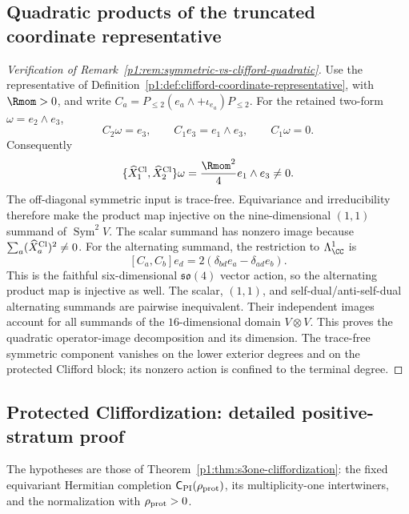 \documentclass[11pt]{article}
\begin{document}
\subsection{Quadratic products of the truncated coordinate representative}
\label{p1:app:truncated-quadratic-content}

\begin{proof}[Verification of Remark~\ref{p1:rem:symmetric-vs-clifford-quadratic}]
Use the representative of
Definition~\ref{p1:def:clifford-coordinate-representative}, with
\(\Rmom>0\), and write
\(C_a=P_{\le2}(e_a\wedge+\iota_{e_a})P_{\le2}\).
For the retained two-form \(\omega=e_2\wedge e_3\),
\[
 C_2\omega=e_3,\qquad C_1e_3=e_1\wedge e_3,\qquad C_1\omega=0.
\]
Consequently
\[
 \{\widehat X_1^{\rm Cl},\widehat X_2^{\rm Cl}\}\omega
 =\frac{\Rmom^2}{4}e_1\wedge e_3\ne0.
\]
The off-diagonal symmetric input is trace-free.  Equivariance and
irreducibility therefore make the product map injective on the
nine-dimensional \((1,1)\) summand of \(\operatorname{Sym}^2V\).
The scalar summand has nonzero image because
\(\sum_a(\widehat X_a^{\rm Cl})^2\ne0\).
For the alternating summand, the restriction to \(\Lambda^1_\CC\) is
\[
 [C_a,C_b]e_d=2(\delta_{bd}e_a-\delta_{ad}e_b).
\]
This is the faithful six-dimensional \(\mathfrak{so}(4)\) vector action,
so the alternating product map is injective as well.  The scalar,
\((1,1)\), and self-dual/anti-self-dual alternating summands are pairwise
inequivalent.  Their independent images account for all summands of the
\(16\)-dimensional domain \(V\otimes V\).  This proves the quadratic
operator-image decomposition and its dimension.  The trace-free symmetric
component vanishes on the lower exterior degrees and on the protected
Clifford block; its nonzero action is confined to the terminal degree.
\end{proof}

\subsection{Protected Cliffordization: detailed positive-stratum proof}
\label{p1:app:protected-cliffordization-proof}
The hypotheses are those of
Theorem~\ref{p1:thm:s3one-cliffordization}: the fixed equivariant Hermitian
completion \(\mathsf C_{\rm PI}(\rho_{\rm prot})\), its multiplicity-one
intertwiners, and the normalization with \(\rho_{\rm prot}>0\).
\end{document}
